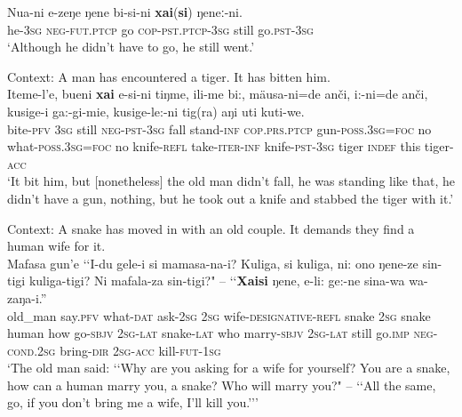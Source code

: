 \begin{exe}
	\ex\label{exAppendixUdiheConcessive1}
	\gll Nua-ni e-zeŋe ŋene bi-si-ni \textbf{xai}(\textbf{si}) ŋeneː-ni.\\
	he-3\textsc{sg} \textsc{neg}-\textsc{fut}.\textsc{ptcp} go \textsc{cop}-\textsc{pst}.\textsc{ptcp}-3\textsc{sg} still go.\textsc{pst}-3\textsc{sg}\\
	\glt \lq Although he didn't have to go, he still went.\rq{ }\parencite[440]{NikolaevaTolskaya2001}

	\ex\label{exAppendixUdiheConcessive2}
	Context: A man has encountered a tiger. It has bitten him.\\
	\gll Iteme-l'e, bueni \textbf{xai} e-si-ni tiŋme, ili-me bi:, mäusa-ni=de anči, i:-ni=de anči, kusige-i ga:-gi-mie, kusige-le:-ni tig(ra) aŋi uti kuti-we.\\
	bite-\textsc{pfv} 3\textsc{sg} still \textsc{neg}-\textsc{pst}-3\textsc{sg} fall stand-\textsc{inf} \textsc{cop}.\textsc{prs}.\textsc{ptcp} gun-\textsc{poss}.3\textsc{sg}=\textsc{foc} no what-\textsc{poss}.3\textsc{sg}=\textsc{foc} no knife-\textsc{refl} take-\textsc{iter}-\textsc{inf} knife-\textsc{pst}-3\textsc{sg} tiger \textsc{indef} this tiger-\textsc{acc}\\
	\glt \lq It bit him, but [nonetheless] the old man didn’t fall, he was standing like that, he didn’t have a gun, nothing, but he took out a knife and stabbed the tiger with it.' 
	\parencite[An old woman and her tiger cub]{NikolaevaEtAl2019}
	
	\ex\label{exAppendixUdiheConcessive3}
	Context: A snake has moved in with an old couple. It demands they find a human wife for it.\\
	\gll
	Mafasa gun'e \lq\lq I-du gele-i si mamasa-na-i? Kuliga, si kuliga, ni: ono ŋene-ze sin-tigi kuliga-tigi? Ni mafala-za sin-tigi?" – \lq\lq \textbf{Xaisi} ŋene, e-li: ge:-ne sina-wa wa-zaŋa-i.”\\
	old\_man say.\textsc{pfv} \phantom{\lq\lq}what-\textsc{dat} ask-2\textsc{sg} 2\textsc{sg} wife-\textsc{designative}-\textsc{refl} snake 2\textsc{sg} snake human how go-\textsc{sbjv} 2\textsc{sg}-\textsc{lat} snake-\textsc{lat} who marry-\textsc{sbjv} 2\textsc{sg}-\textsc{lat} {} \phantom{\lq\lq}still go.\textsc{imp} \textsc{neg}-\textsc{cond}.2\textsc{sg} bring-\textsc{dir} 2\textsc{sg}-\textsc{acc} kill-\textsc{fut}-1\textsc{sg}\\
	\glt \lq The old man said: \lq\lq Why are you asking for a wife for yourself? You are a snake, how can a human marry you, a snake? Who will marry you?" – \lq\lq All the same, go, if you don’t bring me a wife, I’ll kill you.{\rq\rq}\rq{ }\parencite[Zabdala, an extraordinary snake]{NikolaevaEtAl2019}
	

\end{exe}
